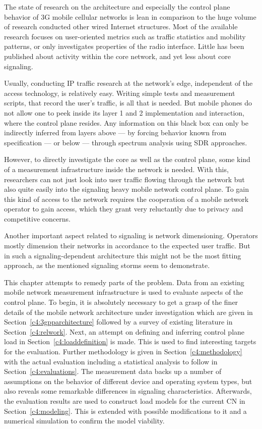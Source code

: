 The state of research on the architecture and especially the control plane behavior of \gls{3G} mobile cellular networks is lean in comparison to the huge volume of research conducted other wired Internet structures. Most of the available research focuses on user-oriented metrics such as traffic statistics and mobility patterns, or only investigates properties of the radio interface. Little has been published about activity within the core network, and yet less about core signaling. 

Usually, conducting \gls{IP} traffic research at the network's edge, independent of the access technology, is relatively easy. Writing simple tests and measurement scripts, that record the user's traffic, is all that is needed. But mobile phones do not allow one to peek inside its layer 1 and 2 implementation and interaction, where the control plane resides. Any information on this black box can only be indirectly inferred from layers above --- by forcing behavior known from specification --- or below --- through spectrum analysis using \gls{SDR} approaches. 

However, to directly investigate the core as well as the control plane, some kind of a measurement infrastructure inside the network is needed. With this, researchers can not just look into user traffic flowing through the network but also quite easily into the signaling heavy mobile network control plane. To gain this kind of access to the network requires the cooperation of a mobile network operator to gain access, which they grant very reluctantly due to privacy and competitive concerns.

Another important aspect related to signaling is network dimensioning. Operators mostly dimension their networks in accordance to the expected user traffic. But in such a signaling-dependent architecture this might not be the most fitting approach, as the mentioned signaling storms seem to demonstrate. 

This chapter attempts to remedy parts of the problem. Data from an existing mobile network measurement infrastructure is used to evaluate aspects of the control plane. 
To begin, it is absolutely necessary to get a grasp of the finer details of the mobile network architecture under investigation which are given in Section~\ref{c4:3gpparchitecture} followed by a survey of existing literature in Section~\ref{c4:relwork}. Next, an attempt on defining and inferring control plane load in Section~\ref{c4:loaddefinition} is made. This is used to find interesting targets for the evaluation.
Further methodology is given in Section~\ref{c4:methodology} with the  actual evaluation including a statistical analysis to follow in Section~\ref{c4:evaluations}. The measurement data backs up a number of assumptions on the behavior of different device and operating system types, but also reveals some remarkable differences in signaling characteristics. Afterwards, the evaluation results are used to construct load models for the current \gls{CN} in Section~\ref{c4:modeling}. This is extended with possible modifications to it and a numerical simulation to confirm the model viability.



